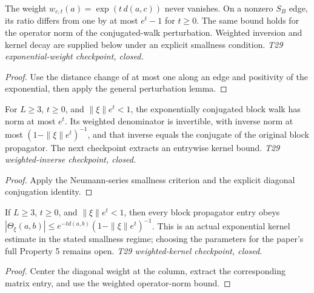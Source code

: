 \begin{lemma}
  \label{lem:combes-thomas-exponential-weight}
  \leanok
  The weight $w_{c,t}(a)=\exp(t\,d(a,c))$ never vanishes. On a
  nonzero $S_B$ edge, its ratio differs from one by at most $e^t-1$
  for $t\geq0$. The same bound holds for the operator norm of the
  conjugated-walk perturbation. Weighted inversion and kernel decay
  are supplied below under an explicit smallness condition.
  \emph{T29 exponential-weight checkpoint, closed.}
\end{lemma}
\begin{proof}\leanok
  Use the distance change of at most one along an edge and positivity
  of the exponential, then apply the general perturbation lemma.
\end{proof}

\begin{lemma}
  \label{lem:combes-thomas-weighted-inverse}
  \leanok
  For $L\geq3$, $t\geq0$, and $\|\xi\|e^t<1$, the exponentially
  conjugated block walk has norm at most $e^t$. Its weighted denominator
  is invertible, with inverse norm at most $(1-\|\xi\|e^t)^{-1}$, and
  that inverse equals the conjugate of the original block propagator.
  The next checkpoint extracts an entrywise kernel bound.
  \emph{T29 weighted-inverse checkpoint, closed.}
\end{lemma}
\begin{proof}\leanok
  Apply the Neumann-series smallness criterion and the explicit
  diagonal conjugation identity.
\end{proof}

\begin{lemma}
  \label{lem:combes-thomas-kernel-decay}
  \leanok
  If $L\geq3$, $t\geq0$, and $\|\xi\|e^t<1$, then every block
  propagator entry obeys
  $|\Theta_\xi(a,b)|\leq
  e^{-t d(a,b)}(1-\|\xi\|e^t)^{-1}$.
  This is an actual exponential kernel estimate in the stated
  smallness regime; choosing the parameters for the paper's full
  Property 5 remains open.
  \emph{T29 weighted-kernel checkpoint, closed.}
\end{lemma}
\begin{proof}\leanok
  Center the diagonal weight at the column, extract the corresponding
  matrix entry, and use the weighted operator-norm bound.
\end{proof}

